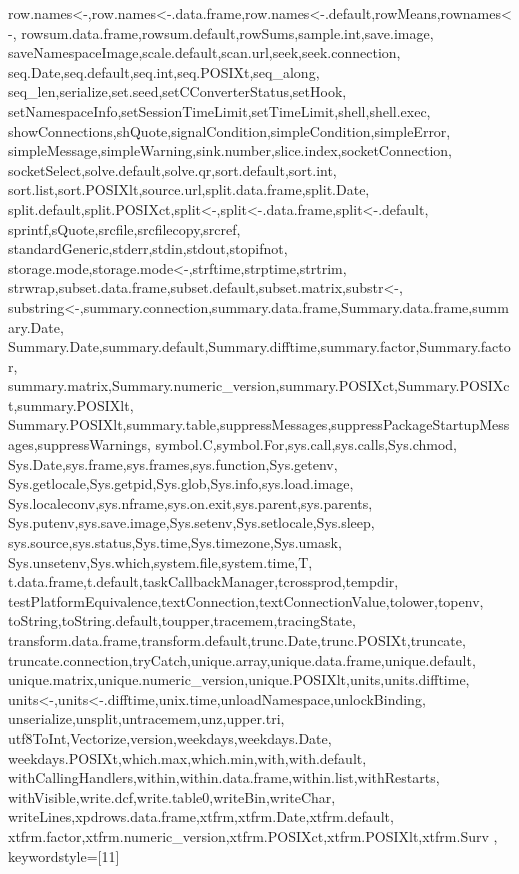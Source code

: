 {{row.names<-,row.names<-.data.frame,row.names<-.default,rowMeans,rownames<-,%
rowsum.data.frame,rowsum.default,rowSums,sample.int,save.image,%
saveNamespaceImage,scale.default,scan.url,seek,seek.connection,%
seq.Date,seq.default,seq.int,seq.POSIXt,seq_along,%
seq_len,serialize,set.seed,setCConverterStatus,setHook,%
setNamespaceInfo,setSessionTimeLimit,setTimeLimit,shell,shell.exec,%
showConnections,shQuote,signalCondition,simpleCondition,simpleError,%
simpleMessage,simpleWarning,sink.number,slice.index,socketConnection,%
socketSelect,solve.default,solve.qr,sort.default,sort.int,%
sort.list,sort.POSIXlt,source.url,split.data.frame,split.Date,%
split.default,split.POSIXct,split<-,split<-.data.frame,split<-.default,%
sprintf,sQuote,srcfile,srcfilecopy,srcref,%
standardGeneric,stderr,stdin,stdout,stopifnot,%
storage.mode,storage.mode<-,strftime,strptime,strtrim,%
strwrap,subset.data.frame,subset.default,subset.matrix,substr<-,%
substring<-,summary.connection,summary.data.frame,Summary.data.frame,summary.Date,%
Summary.Date,summary.default,Summary.difftime,summary.factor,Summary.factor,%
summary.matrix,Summary.numeric_version,summary.POSIXct,Summary.POSIXct,summary.POSIXlt,%
Summary.POSIXlt,summary.table,suppressMessages,suppressPackageStartupMessages,suppressWarnings,%
symbol.C,symbol.For,sys.call,sys.calls,Sys.chmod,%
Sys.Date,sys.frame,sys.frames,sys.function,Sys.getenv,%
Sys.getlocale,Sys.getpid,Sys.glob,Sys.info,sys.load.image,%
Sys.localeconv,sys.nframe,sys.on.exit,sys.parent,sys.parents,%
Sys.putenv,sys.save.image,Sys.setenv,Sys.setlocale,Sys.sleep,%
sys.source,sys.status,Sys.time,Sys.timezone,Sys.umask,%
Sys.unsetenv,Sys.which,system.file,system.time,T,%
t.data.frame,t.default,taskCallbackManager,tcrossprod,tempdir,%
testPlatformEquivalence,textConnection,textConnectionValue,tolower,topenv,%
toString,toString.default,toupper,tracemem,tracingState,%
transform.data.frame,transform.default,trunc.Date,trunc.POSIXt,truncate,%
truncate.connection,tryCatch,unique.array,unique.data.frame,unique.default,%
unique.matrix,unique.numeric_version,unique.POSIXlt,units,units.difftime,%
units<-,units<-.difftime,unix.time,unloadNamespace,unlockBinding,%
unserialize,unsplit,untracemem,unz,upper.tri,%
utf8ToInt,Vectorize,version,weekdays,weekdays.Date,%
weekdays.POSIXt,which.max,which.min,with,with.default,%
withCallingHandlers,within,within.data.frame,within.list,withRestarts,%
withVisible,write.dcf,write.table0,writeBin,writeChar,%
writeLines,xpdrows.data.frame,xtfrm,xtfrm.Date,xtfrm.default,%
xtfrm.factor,xtfrm.numeric_version,xtfrm.POSIXct,xtfrm.POSIXlt,xtfrm.Surv%
},%
keywordstyle={[11]{\color{blue}}}%
}
%
%

